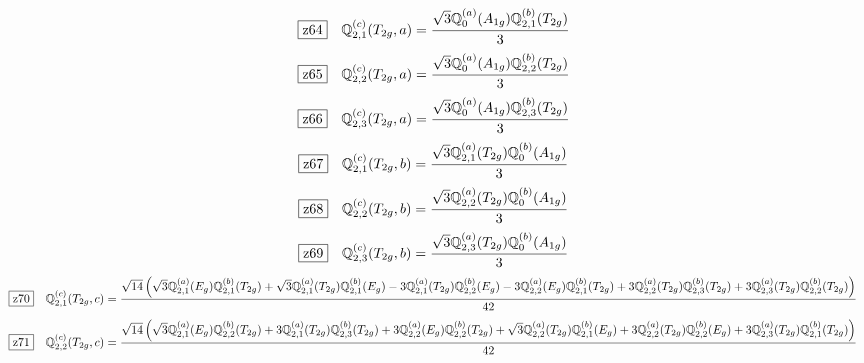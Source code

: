 \documentclass[fleqn,10pt,landscape]{jsarticle}
\begin{document}
\begin{dmath*}
\hspace*{3mm}\fbox{z64}\quad \mathbb{Q}_{2,1}^{(c)}(T_{2g},a)=\frac{\sqrt{3} \mathbb{Q}_{0}^{(a)}(A_{1g}) \mathbb{Q}_{2,1}^{(b)}(T_{2g})}{3}
\end{dmath*}
\begin{dmath*}
\hspace*{3mm}\fbox{z65}\quad \mathbb{Q}_{2,2}^{(c)}(T_{2g},a)=\frac{\sqrt{3} \mathbb{Q}_{0}^{(a)}(A_{1g}) \mathbb{Q}_{2,2}^{(b)}(T_{2g})}{3}
\end{dmath*}
\begin{dmath*}
\hspace*{3mm}\fbox{z66}\quad \mathbb{Q}_{2,3}^{(c)}(T_{2g},a)=\frac{\sqrt{3} \mathbb{Q}_{0}^{(a)}(A_{1g}) \mathbb{Q}_{2,3}^{(b)}(T_{2g})}{3}
\end{dmath*}
\begin{dmath*}
\hspace*{3mm}\fbox{z67}\quad \mathbb{Q}_{2,1}^{(c)}(T_{2g},b)=\frac{\sqrt{3} \mathbb{Q}_{2,1}^{(a)}(T_{2g}) \mathbb{Q}_{0}^{(b)}(A_{1g})}{3}
\end{dmath*}
\begin{dmath*}
\hspace*{3mm}\fbox{z68}\quad \mathbb{Q}_{2,2}^{(c)}(T_{2g},b)=\frac{\sqrt{3} \mathbb{Q}_{2,2}^{(a)}(T_{2g}) \mathbb{Q}_{0}^{(b)}(A_{1g})}{3}
\end{dmath*}
\begin{dmath*}
\hspace*{3mm}\fbox{z69}\quad \mathbb{Q}_{2,3}^{(c)}(T_{2g},b)=\frac{\sqrt{3} \mathbb{Q}_{2,3}^{(a)}(T_{2g}) \mathbb{Q}_{0}^{(b)}(A_{1g})}{3}
\end{dmath*}
\begin{dmath*}
\hspace*{3mm}\fbox{z70}\quad \mathbb{Q}_{2,1}^{(c)}(T_{2g},c)=\frac{\sqrt{14} \left(\sqrt{3} \mathbb{Q}_{2,1}^{(a)}(E_{g}) \mathbb{Q}_{2,1}^{(b)}(T_{2g}) + \sqrt{3} \mathbb{Q}_{2,1}^{(a)}(T_{2g}) \mathbb{Q}_{2,1}^{(b)}(E_{g}) - 3 \mathbb{Q}_{2,1}^{(a)}(T_{2g}) \mathbb{Q}_{2,2}^{(b)}(E_{g}) - 3 \mathbb{Q}_{2,2}^{(a)}(E_{g}) \mathbb{Q}_{2,1}^{(b)}(T_{2g}) + 3 \mathbb{Q}_{2,2}^{(a)}(T_{2g}) \mathbb{Q}_{2,3}^{(b)}(T_{2g}) + 3 \mathbb{Q}_{2,3}^{(a)}(T_{2g}) \mathbb{Q}_{2,2}^{(b)}(T_{2g})\right)}{42}
\end{dmath*}
\begin{dmath*}
\hspace*{3mm}\fbox{z71}\quad \mathbb{Q}_{2,2}^{(c)}(T_{2g},c)=\frac{\sqrt{14} \left(\sqrt{3} \mathbb{Q}_{2,1}^{(a)}(E_{g}) \mathbb{Q}_{2,2}^{(b)}(T_{2g}) + 3 \mathbb{Q}_{2,1}^{(a)}(T_{2g}) \mathbb{Q}_{2,3}^{(b)}(T_{2g}) + 3 \mathbb{Q}_{2,2}^{(a)}(E_{g}) \mathbb{Q}_{2,2}^{(b)}(T_{2g}) + \sqrt{3} \mathbb{Q}_{2,2}^{(a)}(T_{2g}) \mathbb{Q}_{2,1}^{(b)}(E_{g}) + 3 \mathbb{Q}_{2,2}^{(a)}(T_{2g}) \mathbb{Q}_{2,2}^{(b)}(E_{g}) + 3 \mathbb{Q}_{2,3}^{(a)}(T_{2g}) \mathbb{Q}_{2,1}^{(b)}(T_{2g})\right)}{42}
\end{dmath*}
\end{document}
